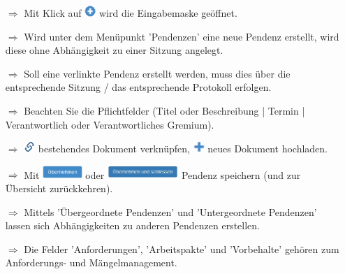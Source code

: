 \documentclass{article}
\begin{document}
\begin{multicols}{2}
\begin{tcolorbox}[colback=blue!5,colframe=blue!40!black,title=Neue Pendenzen erstellen]
\begin{itemize}
  \item[$\Longrightarrow$] Mit Klick auf \includegraphics[height=12pt]{Icons/Plussymbol.png} wird die Eingabemaske geöffnet.
  \item[$\Longrightarrow$] Wird unter dem Menüpunkt 'Pendenzen' eine neue Pendenz erstellt, wird diese ohne Abhängigkeit zu einer Sitzung angelegt.
  \item[$\Longrightarrow$] Soll eine verlinkte Pendenz erstellt werden, muss dies über die entsprechende Sitzung / das entsprechende Protokoll erfolgen.
  \item[$\Longrightarrow$] Beachten Sie die Pflichtfelder (Titel oder Beschreibung | Termin | Verantwortlich oder Verantwortliches Gremium).
	\item[$\Longrightarrow$] \includegraphics[height=12pt]{Icons/Link.png} bestehendes Dokument verknüpfen, \includegraphics[height=12pt]{Icons/Pluszeichen.png} neues Dokument hochladen.
	\item[$\Longrightarrow$] Mit \includegraphics[height=14pt]{Icons/B_Uebernehmen.jpg} oder \includegraphics[height=14pt]{Icons/ueb_schliessen.png} Pendenz speichern (und zur Übersicht zurückkehren).
	\item[$\Longrightarrow$] Mittels 'Übergeordnete Pendenzen' und 'Untergeordnete Pendenzen' lassen sich Abhängigkeiten zu anderen Pendenzen erstellen.	
	\item[$\Longrightarrow$] Die Felder 'Anforderungen', 'Arbeitspakte' und 'Vorbehalte' gehören zum Anforderungs- und Mängelmanagement.
\end{itemize}
\end{tcolorbox}

\end{multicols}

\end{document}
